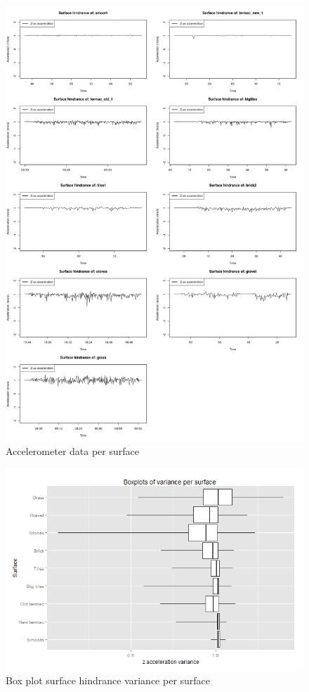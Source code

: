 \begin{figure}[ht]
\includegraphics[width=\textwidth]{img/R_surfaces_zax_acc.png}
\centering
\caption[Accelerometer data per surface]{
Accelerometer data per surface\label{figsurfaces}}
\end{figure} 

\begin{figure}[ht]
\includegraphics[width=\textwidth]{img/R_Surfaces_Variance.jpeg}
\centering
\caption{Box plot surface hindrance variance per surface \label{boxhindrance}}
\end{figure} 

